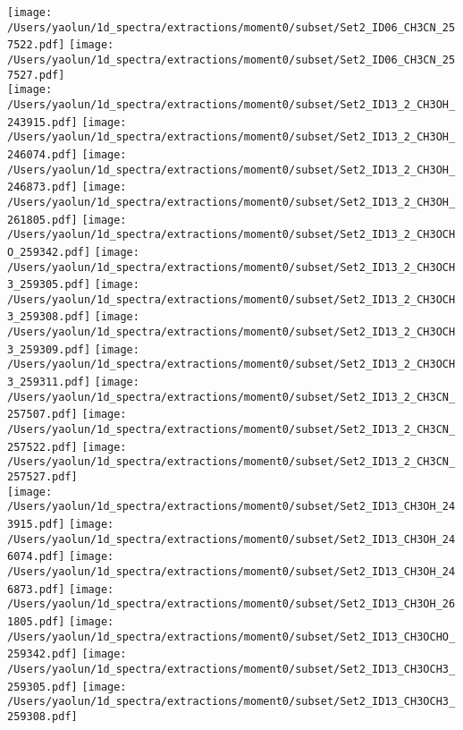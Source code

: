 \begin{figure*}[htbp!]
  \texttt{[image: /Users/yaolun/1d\_spectra/extractions/moment0/subset/Set2\_ID06\_CH3CN\_257522.pdf]}
  \texttt{[image: /Users/yaolun/1d\_spectra/extractions/moment0/subset/Set2\_ID06\_CH3CN\_257527.pdf]}
  \\
  \texttt{[image: /Users/yaolun/1d\_spectra/extractions/moment0/subset/Set2\_ID13\_2\_CH3OH\_243915.pdf]}
  \texttt{[image: /Users/yaolun/1d\_spectra/extractions/moment0/subset/Set2\_ID13\_2\_CH3OH\_246074.pdf]}
  \texttt{[image: /Users/yaolun/1d\_spectra/extractions/moment0/subset/Set2\_ID13\_2\_CH3OH\_246873.pdf]}
  \texttt{[image: /Users/yaolun/1d\_spectra/extractions/moment0/subset/Set2\_ID13\_2\_CH3OH\_261805.pdf]}
  \texttt{[image: /Users/yaolun/1d\_spectra/extractions/moment0/subset/Set2\_ID13\_2\_CH3OCHO\_259342.pdf]}
  \texttt{[image: /Users/yaolun/1d\_spectra/extractions/moment0/subset/Set2\_ID13\_2\_CH3OCH3\_259305.pdf]}
  \texttt{[image: /Users/yaolun/1d\_spectra/extractions/moment0/subset/Set2\_ID13\_2\_CH3OCH3\_259308.pdf]}
  \texttt{[image: /Users/yaolun/1d\_spectra/extractions/moment0/subset/Set2\_ID13\_2\_CH3OCH3\_259309.pdf]}
  \texttt{[image: /Users/yaolun/1d\_spectra/extractions/moment0/subset/Set2\_ID13\_2\_CH3OCH3\_259311.pdf]}
  \texttt{[image: /Users/yaolun/1d\_spectra/extractions/moment0/subset/Set2\_ID13\_2\_CH3CN\_257507.pdf]}
  \texttt{[image: /Users/yaolun/1d\_spectra/extractions/moment0/subset/Set2\_ID13\_2\_CH3CN\_257522.pdf]}
  \texttt{[image: /Users/yaolun/1d\_spectra/extractions/moment0/subset/Set2\_ID13\_2\_CH3CN\_257527.pdf]}
  \\
  \texttt{[image: /Users/yaolun/1d\_spectra/extractions/moment0/subset/Set2\_ID13\_CH3OH\_243915.pdf]}
  \texttt{[image: /Users/yaolun/1d\_spectra/extractions/moment0/subset/Set2\_ID13\_CH3OH\_246074.pdf]}
  \texttt{[image: /Users/yaolun/1d\_spectra/extractions/moment0/subset/Set2\_ID13\_CH3OH\_246873.pdf]}
  \texttt{[image: /Users/yaolun/1d\_spectra/extractions/moment0/subset/Set2\_ID13\_CH3OH\_261805.pdf]}
  \texttt{[image: /Users/yaolun/1d\_spectra/extractions/moment0/subset/Set2\_ID13\_CH3OCHO\_259342.pdf]}
  \texttt{[image: /Users/yaolun/1d\_spectra/extractions/moment0/subset/Set2\_ID13\_CH3OCH3\_259305.pdf]}
  \texttt{[image: /Users/yaolun/1d\_spectra/extractions/moment0/subset/Set2\_ID13\_CH3OCH3\_259308.pdf]}

\end{figure*}
